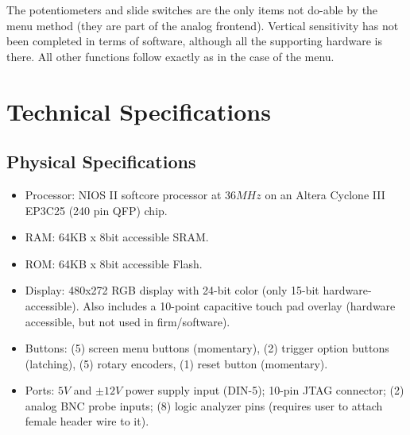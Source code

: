 The potentiometers and slide switches are the only items not do-able by the menu method (they are part of the analog frontend). Vertical sensitivity has not been completed in terms of software, although all the supporting hardware is there. All other functions follow exactly as in the case of the menu.

\section{Technical Specifications}\label{techspecs}
\subsection{Physical Specifications}
\begin{itemize}
	\item Processor: NIOS II softcore processor at $36MHz$ on an Altera Cyclone III EP3C25 (240 pin QFP) chip.
	\item RAM: 64KB x 8bit accessible SRAM.
	\item ROM: 64KB x 8bit accessible Flash.
	\item Display: 480x272 RGB display with 24-bit color (only 15-bit hardware-accessible). Also includes a 10-point capacitive touch pad overlay (hardware accessible, but not used in firm/software).
	\item Buttons: (5) screen menu buttons (momentary), (2) trigger option buttons (latching), (5) rotary encoders, (1) reset button (momentary).
	\item Ports: $5V$ and $\pm 12V$ power supply input (DIN-5); 10-pin JTAG connector; (2) analog BNC probe inputs; (8) logic analyzer pins (requires user to attach female header wire to it).
\end{itemize}


